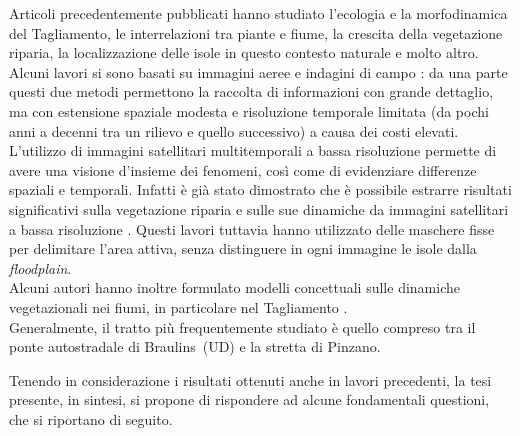 Articoli precedentemente pubblicati hanno studiato l'ecologia e la morfodinamica del Tagliamento, le interrelazioni tra piante e fiume, la crescita della vegetazione riparia, la localizzazione delle isole in questo contesto naturale e molto altro.
\\
Alcuni lavori si sono basati su immagini aeree e indagini di campo : da una parte questi due metodi permettono la raccolta di informazioni con grande dettaglio, ma con estensione spaziale modesta e risoluzione temporale limitata (da pochi anni a decenni tra un rilievo e quello successivo) a causa dei costi elevati.
\\
L'utilizzo di immagini satellitari multitemporali a bassa risoluzione permette di avere una visione d'insieme dei fenomeni, così come di evidenziare differenze spaziali e temporali.
Infatti è già stato dimostrato che è possibile estrarre risultati significativi sulla vegetazione riparia e sulle sue dinamiche da immagini satellitari a bassa risoluzione .
Questi lavori tuttavia hanno utilizzato delle maschere fisse per delimitare l'area attiva, senza distinguere in ogni immagine le isole dalla \emph{floodplain}.
\\
Alcuni autori hanno inoltre formulato modelli concettuali sulle dinamiche vegetazionali nei fiumi, in particolare nel Tagliamento .
\\
Generalmente, il tratto più frequentemente studiato è quello compreso tra il ponte autostradale di Braulins~(UD) e la stretta di Pinzano.

Tenendo in considerazione i risultati ottenuti anche in lavori precedenti, la tesi presente, in sintesi, si propone di rispondere ad alcune fondamentali questioni, che si riportano di seguito.
%
